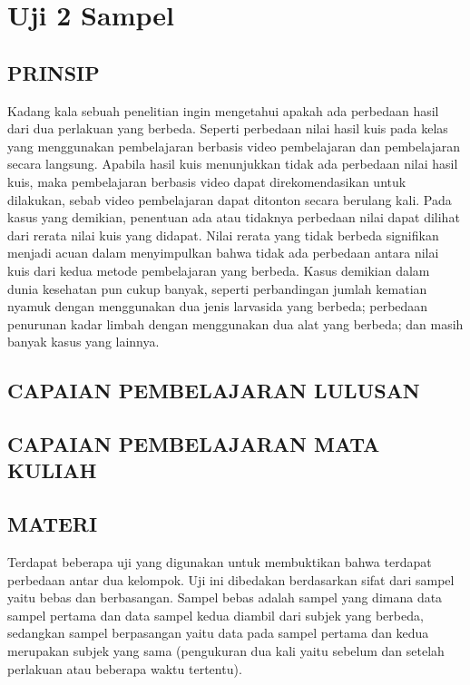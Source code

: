 \documentclass[
]{book}
\begin{document}
\hypertarget{a3-uji-2-sampel}{%
\chapter{Uji 2 Sampel}\label{a3-uji-2-sampel}}

\hypertarget{prinsip-1}{%
\section{PRINSIP}\label{prinsip-1}}

Kadang kala sebuah penelitian ingin mengetahui apakah ada perbedaan hasil dari dua perlakuan yang berbeda. Seperti perbedaan nilai hasil kuis pada kelas yang menggunakan pembelajaran berbasis video pembelajaran dan pembelajaran secara langsung. Apabila hasil kuis menunjukkan tidak ada perbedaan nilai hasil kuis, maka pembelajaran berbasis video dapat direkomendasikan untuk dilakukan, sebab video pembelajaran dapat ditonton secara berulang kali. Pada kasus yang demikian, penentuan ada atau tidaknya perbedaan nilai dapat dilihat dari rerata nilai kuis yang didapat. Nilai rerata yang tidak berbeda signifikan menjadi acuan dalam menyimpulkan bahwa tidak ada perbedaan antara nilai kuis dari kedua metode pembelajaran yang berbeda. Kasus demikian dalam dunia kesehatan pun cukup banyak, seperti perbandingan jumlah kematian nyamuk dengan menggunakan dua jenis larvasida yang berbeda; perbedaan penurunan kadar limbah dengan menggunakan dua alat yang berbeda; dan masih banyak kasus yang lainnya.

\hypertarget{capaian-pembelajaran-lulusan-1}{%
\section{CAPAIAN PEMBELAJARAN LULUSAN}\label{capaian-pembelajaran-lulusan-1}}

\hypertarget{capaian-pembelajaran-mata-kuliah-1}{%
\section{CAPAIAN PEMBELAJARAN MATA KULIAH}\label{capaian-pembelajaran-mata-kuliah-1}}

\hypertarget{materi}{%
\section{MATERI}\label{materi}}

Terdapat beberapa uji yang digunakan untuk membuktikan bahwa terdapat perbedaan antar dua kelompok. Uji ini dibedakan berdasarkan sifat dari sampel yaitu bebas dan berbasangan. Sampel bebas adalah sampel yang dimana data sampel pertama dan data sampel kedua diambil dari subjek yang berbeda, sedangkan sampel berpasangan yaitu data pada sampel pertama dan kedua merupakan subjek yang sama (pengukuran dua kali yaitu sebelum dan setelah perlakuan atau beberapa waktu tertentu).
\end{document}

